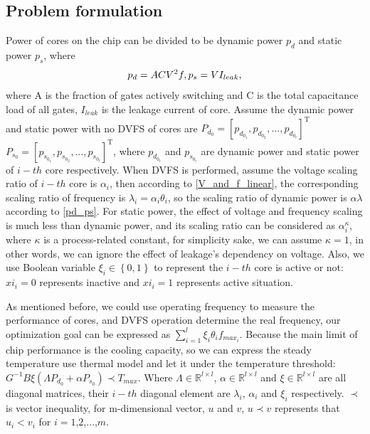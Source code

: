 \subsection{Problem formulation}
Power of cores on the chip can be divided to be dynamic power $p_d$ and static power $p_s$, where
\begin{equation}\label{pd_ps}
p_d=A C V^2 f,\\
p_s=V I_{leak},
\end{equation}
where A is the fraction of gates actively switching and C is the total capacitance load of all gates, $I_{leak}$ is the leakage current of
core.
Assume the dynamic power and static power with no DVFS of cores are $P_{d_0}=[p_{d_{0_1}},p_{d_{0_2}},\ldots,p_{d_{0_l}}]^ \mathrm{ T }$
$P_{s_0}=[p_{s_{0_1}},p_{s_{0_2}},\ldots,p_{s_{0_l}}]^ \mathrm{ T }$, where $p_{d_{0_i}}$ and $p_{s_{0_i}}$ are dynamic power and static power
of $i-th$ core respectively. When DVFS is performed, assume the voltage scaling ratio of $i-th$ core is $\alpha_i$, then according to \ref{V_and_f_linear},
the corresponding scaling ratio of frequency is $\lambda_i=\alpha_i \theta_i$, so the scaling ratio of dynamic power is $\alpha \lambda$ according
to \ref{pd_ps}. For static power, the effect of voltage and frequency scaling is much less than dynamic power, and its scaling ratio can be considered
as $\alpha_i^\kappa$, where $\kappa$ is a process-related constant, for simplicity sake, we can assume $\kappa=1$, in other words, we can ignore
the effect of leakage's dependency on voltage. Also, we use Boolean variable $\xi_i \in \left\{0,1\right\}$ to represent the $i-th$ core is active or
not: $xi_i=0$ represents inactive and $xi_i=1$ represents active situation.

As mentioned before, we could use operating frequency to measure the performance of cores, and DVFS operation determine the real frequency, our
optimization goal can be expressed as $\sum_{i=1}^l \xi_i \theta_i f_{max_i}$. Because the main limit of chip performance is the cooling capacity,
so we can express the steady temperature use thermal model and let it under the temperature threshold:
$G^{-1} B \xi \left( \Lambda P_{d_0} + \alpha P_{s_0} \right) \prec T_{max}$.
Where $\Lambda \in \mathbb{R}^{l \times l} $, $\alpha \in \mathbb{R}^{l \times l} $ and $\xi \in \mathbb{R}^{l \times l}$ are all diagonal matrices,
their $i-th$ diagonal element are $\lambda_i$, $\alpha_i$ and $\xi_i$ respectively. $\prec$ is vector inequality, for m-dimensional vector, $u$ and $v$,
$u \prec v$ represents that $u_i < v_i$ for $i = 1$,$2$,$\ldots$,$m$.

